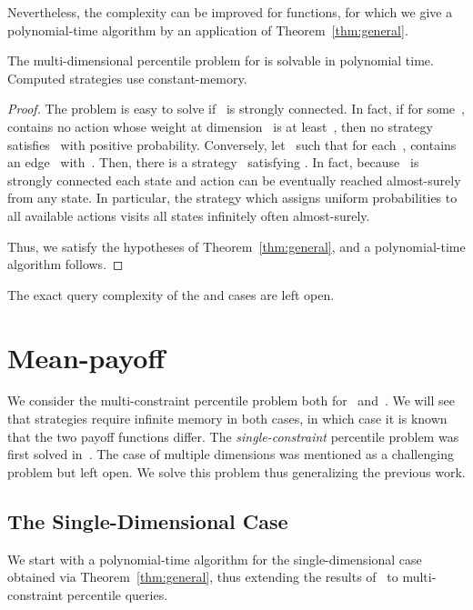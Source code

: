 \documentclass{llncs}
\begin{document}
Nevertheless, the complexity can be improved for  functions, for which we give a polynomial-time algorithm by an application of Theorem~\ref{thm:general}.

\begin{theorem}
  \label{lemma:limsup}
  The multi-dimensional percentile problem for  is solvable in polynomial time.
  Computed strategies use constant-memory.
\end{theorem}

\begin{proof}
  The problem is easy to solve if~ is strongly connected.
  In fact, if for some~,  contains no action whose weight at dimension~ is at least~, 
  then no strategy satisfies~ with positive probability. Conversely, let~ such that for each~,
   contains an edge~ with~. Then, there is a strategy~ satisfying
  . In fact, because~ is strongly connected
  each state and action can be eventually reached almost-surely from any state. 
  In particular, the strategy which assigns uniform probabilities to all available actions visits all states infinitely often almost-surely.
  
  Thus, we satisfy the hypotheses of Theorem~\ref{thm:general}, and a polynomial-time algorithm follows.
\end{proof}

\noindent
The exact query complexity of the  and  cases are left open. 

\section{Mean-payoff}
\label{section:mp}
We consider the multi-constraint percentile problem both for~ and~.
We will see that strategies require infinite memory in both cases, in which case
it is known that the two payoff functions differ.
The \emph{single-constraint} percentile problem was first solved in~\cite{FKR-ieee95}.
The case of multiple dimensions was mentioned as a challenging problem but left open.
We solve this problem thus generalizing the previous work. 

\subsection{The Single-Dimensional Case}

We start with a polynomial-time algorithm for the single-dimensional case
obtained via Theorem~\ref{thm:general}, thus extending the results of~\cite{FKR-ieee95} to multi-constraint percentile queries.
\end{document}
